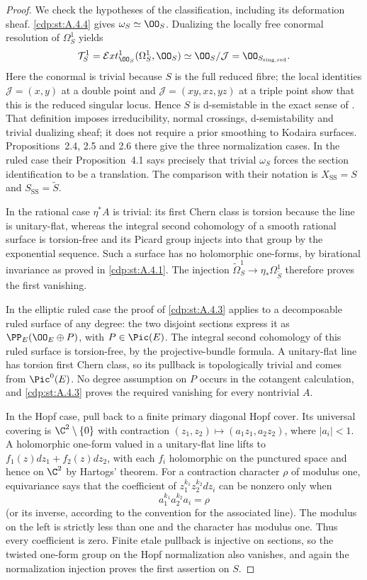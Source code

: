 \begin{proof}
We check the hypotheses of the classification, including its deformation sheaf. \ref{cdp:st:A.4.4} gives $\omega_S\simeq\OO_S$. Dualizing the locally free conormal resolution of $\Omega_S^1$ yields
\[
 \mathcal T^1_S=\mathcal Ext^1_{\OO_S}(\Omega_S^1,\OO_S)
 \simeq\OO_S/\mathcal J=\OO_{S_{\rm sing,red}}.
\]
Here the conormal is trivial because $S$ is the full reduced fibre; the local identities $\mathcal J=(x,y)$ at a double point and $\mathcal J=(xy,xz,yz)$ at a triple point show that this is the reduced singular locus. Hence $S$ is d-semistable in the exact sense of \cite[Definition~2.1]{SS2002}. That definition imposes irreducibility, normal crossings, d-semistability and trivial dualizing sheaf; it does not require a prior smoothing to Kodaira surfaces. Propositions~2.4, 2.5 and 2.6 there give the three normalization cases. In the ruled case their Proposition~4.1 says precisely that trivial $\omega_S$ forces the section identification to be a translation. The comparison with their notation is $X_{\mathrm{SS}}=S$ and $S_{\mathrm{SS}}=\widetilde S$.

In the rational case $\eta^*A$ is trivial: its first Chern class is torsion because the line is unitary-flat, whereas the integral second cohomology of a smooth rational surface is torsion-free and its Picard group injects into that group by the exponential sequence. Such a surface has no holomorphic one-forms, by birational invariance as proved in \ref{cdp:st:A.4.1}. The injection $\widetilde\Omega_S^1\to\eta_*\Omega^1_{\widetilde S}$ therefore proves the first vanishing.

In the elliptic ruled case the proof of \ref{cdp:st:A.4.3} applies to a decomposable ruled surface of any degree: the two disjoint sections express it as $\PP_E(\OO_E\oplus P)$, with $P\in\Pic(E)$. The integral second cohomology of this ruled surface is torsion-free, by the projective-bundle formula. A unitary-flat line has torsion first Chern class, so its pullback is topologically trivial and comes from $\Pic^0(E)$. No degree assumption on $P$ occurs in the cotangent calculation, and \ref{cdp:st:A.4.3} proves the required vanishing for every nontrivial $A$.

In the Hopf case, pull back to a finite primary diagonal Hopf cover. Its universal covering is $\C^2\setminus\{0\}$ with contraction $(z_1,z_2)\mapsto(a_1z_1,a_2z_2)$, where $|a_i|<1$. A holomorphic one-form valued in a unitary-flat line lifts to $f_1(z)dz_1+f_2(z)dz_2$, with each $f_i$ holomorphic on the punctured space and hence on $\C^2$ by Hartogs' theorem. For a contraction character $\rho$ of modulus one, equivariance says that the coefficient of $z_1^{k_1}z_2^{k_2}dz_i$ can be nonzero only when
\[
 a_1^{k_1}a_2^{k_2}a_i=\rho
\]
(or its inverse, according to the convention for the associated line). The modulus on the left is strictly less than one and the character has modulus one. Thus every coefficient is zero. Finite etale pullback is injective on sections, so the twisted one-form group on the Hopf normalization also vanishes, and again the normalization injection proves the first assertion on $S$.


\end{proof}
